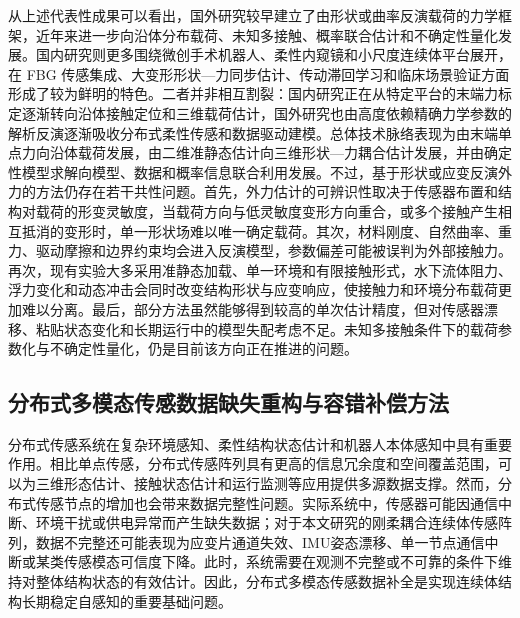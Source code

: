 从上述代表性成果可以看出，国外研究较早建立了由形状或曲率反演载荷的力学框架，近年来进一步向沿体分布载荷、未知多接触、概率联合估计和不确定性量化发展。国内研究则更多围绕微创手术机器人、柔性内窥镜和小尺度连续体平台展开，在 FBG 传感集成、大变形形状—力同步估计、传动滞回学习和临床场景验证方面形成了较为鲜明的特色。二者并非相互割裂：国内研究正在从特定平台的末端力标定逐渐转向沿体接触定位和三维载荷估计，国外研究也由高度依赖精确力学参数的解析反演逐渐吸收分布式柔性传感和数据驱动建模。总体技术脉络表现为由末端单点力向沿体载荷发展，由二维准静态估计向三维形状—力耦合估计发展，并由确定性模型求解向模型、数据和概率信息联合利用发展。不过，基于形状或应变反演外力的方法仍存在若干共性问题。首先，外力估计的可辨识性取决于传感器布置和结构对载荷的形变灵敏度，当载荷方向与低灵敏度变形方向重合，或多个接触产生相互抵消的变形时，单一形状场难以唯一确定载荷。其次，材料刚度、自然曲率、重力、驱动摩擦和边界约束均会进入反演模型，参数偏差可能被误判为外部接触力。再次，现有实验大多采用准静态加载、单一环境和有限接触形式，水下流体阻力、浮力变化和动态冲击会同时改变结构形状与应变响应，使接触力和环境分布载荷更加难以分离。最后，部分方法虽然能够得到较高的单次估计精度，但对传感器漂移、粘贴状态变化和长期运行中的模型失配考虑不足。未知多接触条件下的载荷参数化与不确定性量化，仍是目前该方向正在推进的问题。
\subsection{分布式多模态传感数据缺失重构与容错补偿方法}
分布式传感系统在复杂环境感知、柔性结构状态估计和机器人本体感知中具有重要作用。相比单点传感，分布式传感阵列具有更高的信息冗余度和空间覆盖范围，可以为三维形态估计、接触状态估计和运行监测等应用提供多源数据支撑。然而，分布式传感节点的增加也会带来数据完整性问题。实际系统中，传感器可能因通信中断、环境干扰或供电异常而产生缺失数据；对于本文研究的刚柔耦合连续体传感阵列，数据不完整还可能表现为应变片通道失效、IMU姿态漂移、单一节点通信中断或某类传感模态可信度下降。此时，系统需要在观测不完整或不可靠的条件下维持对整体结构状态的有效估计。因此，分布式多模态传感数据补全是实现连续体结构长期稳定自感知的重要基础问题。

